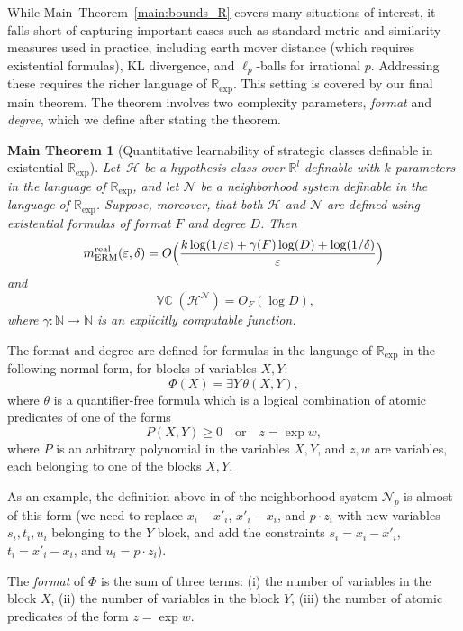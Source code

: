 \documentclass[11pt]{article}
\theoremstyle{plain}
\newtheorem{maintheorem}{Main Theorem}
\theoremstyle{definition}
\theoremstyle{remark}
\DeclareMathOperator{\VCdim}{\mathbb{VC}}
\begin{document}
While Main~Theorem~\ref{main:bounds_R} covers many situations of interest, it falls short of capturing important cases such as standard metric and similarity measures used in practice, including earth mover distance (which requires existential formulas), KL divergence, and $\ell_p$-balls for irrational $p$. Addressing these requires the richer language of $\mathbb R_{\exp}$. This setting is covered by our final main theorem. The theorem involves two complexity parameters, \emph{format} and \emph{degree}, which we define after stating the theorem.


\begin{maintheorem}[Quantitative learnability of strategic classes definable in existential $\mathbb R_{\exp}$]
\label{main:bounds_R_exp}
Let~$\mathcal H$ be a hypothesis class over $\mathbb R^l$ definable with $k$ parameters in the language of $\mathbb R_{\exp}$, and let $\mathcal N$ be a neighborhood system definable in the language of $\mathbb R_{\exp}$. Suppose, moreover, that both $\mathcal H$ and $\mathcal N$ are defined using existential formulas of format $F$ and degree $D$. Then
\[
  m_{\mathrm{ERM}}^{\mathrm{real}}(\varepsilon,\delta)=  O\Bigl(\frac{k\log(1/\varepsilon) + \gamma(F) \log(D) + \log(1/\delta)}{\varepsilon}\Bigr)
\]
and
\[
\VCdim(\mathcal H^\mathcal N)  = O_F(\log D),
\]
where $\gamma\colon \mathbb N \to \mathbb N$ is an explicitly computable function.
\end{maintheorem}

The format and degree are defined for formulas in the language of $\mathbb R_{\exp}$ in the following normal form, for blocks of variables $X,Y$:
\[
 \Phi(X) = \exists Y \, \theta(X,Y),
\]
where $\theta$ is a quantifier-free formula which is a logical combination of atomic predicates of one of the forms
\[
 P(X,Y) \ge 0 \quad \text{or} \quad z = \exp w,
\]
where $P$ is an arbitrary polynomial in the variables $X,Y$, and $z,w$ are variables, each belonging to one of the blocks $X,Y$.

As an example, the definition above in  of the neighborhood system $\mathcal{N}_p$ is almost of this form (we need to replace $x_i - x'_i$, $x'_i - x_i$, and $p\cdot z_i$ with new variables $s_i,t_i,u_i$ belonging to the $Y$ block, and add the constraints $s_i = x_i - x'_i$, $t_i = x'_i - x_i$, and $u_i = p \cdot z_i$).

The \emph{format} of $\Phi$ is the sum of three terms: (i) the number of variables in the block $X$, (ii) the number of variables in the block $Y$, (iii) the number of atomic predicates of the form $z = \exp w$.
\end{document}
